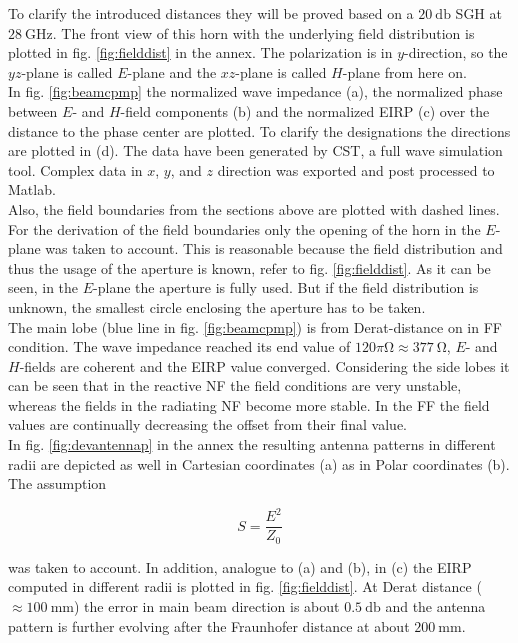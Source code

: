 To clarify the introduced distances they will be proved based on a $\SI{20}{\decibel}$ \ac{SGH} at $\SI{28}{\giga\hertz}$. The front view of this horn with the underlying field distribution is plotted in fig. \ref{fig:fielddist} in the annex. The polarization is in $y$-direction, so the $yz$-plane is called $E$-plane and the $xz$-plane is called $H$-plane from here on.\\
In fig. \ref{fig:beamcpmp} the normalized wave impedance (a), the normalized phase between $E$- and $H$-field components (b) and the normalized \ac{EIRP} (c) over the distance to the phase center are plotted. To clarify the designations the directions are plotted in (d). The data have been generated by CST\texttrademark , a full wave simulation tool. Complex data in $x$, $y$, and $z$ direction was exported and post processed to Matlab\texttrademark{}.\\
Also, the field boundaries from the sections above are plotted with dashed lines. For the derivation of the field boundaries only the opening of the horn in the $E$-plane was taken to account. This is reasonable because the field distribution and thus the usage of the aperture is known, refer to fig. \ref{fig:fielddist}. As it can be seen, in the $E$-plane the aperture is fully used. But if the field distribution is unknown, the smallest circle enclosing the aperture has to be taken.\\
The main lobe (blue line in fig. \ref{fig:beamcpmp}) is from Derat-distance on in \ac{FF} condition. The wave impedance reached its end value of $120\pi\si{\ohm}\approx\SI{377}{\ohm}$, $E$- and $H$-fields are coherent and the \ac{EIRP} value converged. Considering the side lobes it can be seen that in the reactive \ac{NF} the field conditions are very unstable, whereas the fields in the radiating \ac{NF} become more stable. In the \ac{FF} the field values are continually decreasing the offset from their final value.\\
In fig. \ref{fig:devantennap} in the annex the resulting antenna patterns in different radii are depicted as well in Cartesian coordinates (a) as in Polar coordinates (b). The assumption 

\begin{equation}
S = \frac{E^2}{Z_0}
\label{eq:poynting}
\end{equation}

was taken to account. In addition, analogue to (a) and (b), in (c) the \ac{EIRP} computed in different radii is plotted in fig. \ref{fig:fielddist}. At Derat distance ($\approx\SI{100}{\milli\meter}$) the error in main beam direction is about $\SI{0.5}{\decibel}$ and the antenna pattern is further evolving after the Fraunhofer distance at about $\SI{200}{\milli\meter}$.

